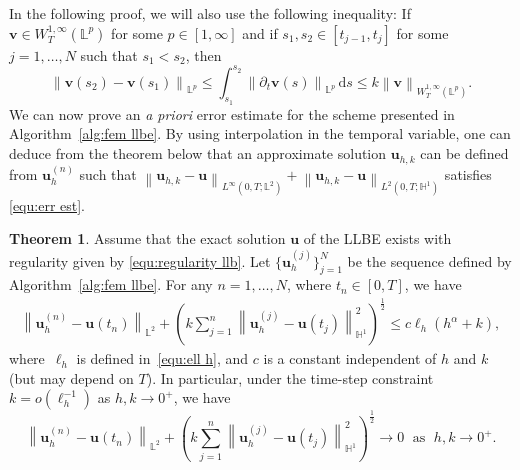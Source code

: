 \documentclass[11pt,reqno]{amsart}
\theoremstyle{definition}
\newtheorem{theorem}{Theorem}[section]
\numberwithin{equation}{section}
\newcommand{\bff}{\boldsymbol}
\newcommand{\bb}{\mathbb}
\newcommand{\ds}{\mathrm{d}s}
\newcommand{\norm}[2]{\left\|{#1}\right\|_{#2}}
\begin{document}
In the following proof, we will also use the following inequality: If $\bff{v}\in W^{1,\infty}_T(\bb{L}^p)$ for some $p\in [1,\infty]$ and if $s_1,s_2\in [t_{j-1},t_j]$ for some $j=1,\ldots,N$ such that $s_1<s_2$, then
\begin{equation}\label{equ:uj uj1}
	\norm{\bff{v}(s_2)-\bff{v}(s_1)}{\bb{L}^p}
	\leq
	\int_{s_1}^{s_2} \norm{\partial_t \bff{v} (s)}{\bb{L}^p}\, \ds
	\leq
	k \norm{\bff{v}}{W^{1,\infty}_T(\bb{L}^p)}.
\end{equation}
We can now prove an \emph{a priori} error estimate for the scheme presented in Algorithm~\ref{alg:fem llbe}. {By using interpolation in the temporal variable, one can deduce from the theorem below that an approximate solution $\bff{u}_{h,k}$ can be defined from $\bff{u}_h^{(n)}$ such that $\norm{\bff{u}_{h,k}-\bff{u}}{L^\infty(0,T;\bb{L}^2)}+\norm{\bff{u}_{h,k}-\bff{u}}{L^2(0,T;\bb{H}^1)}$ satisfies \eqref{equ:err est}.}

\begin{theorem}\label{the:err llb}
	Assume that the exact solution $\bff{u}$ of the LLBE exists with regularity given by \eqref{equ:regularity llb}. {Let $\big\{\bff{u}_h^{(j)}\big\}_{j=1}^N$ be the sequence defined by Algorithm~\ref{alg:fem llbe}.}
	For any $n=1,\ldots,N$, where $t_n\in [0,T]$, we have
	\begin{align}\label{equ:err est}
	\norm{\bff{u}_h^{(n)}-\bff{u}(t_n)}{\bb{L}^2}
	+
	\left(k \sum_{j=1}^n \norm{\bff{u}_h^{(j)}-\bff{u}(t_j)}{\bb{H}^1}^2 \right)^{\frac12}
	\leq c\ell_h (h^\alpha+k),
	\end{align}
	where~$\ell_h$ is defined in~\eqref{equ:ell h}, and $c$ is a constant independent of $h$ and $k$ (but may depend on $T$). In particular, under the time-step constraint $k=o(\ell_h^{-1})$ as $h,k\to 0^+$, we have 
	\begin{equation*}
	\norm{\bff{u}_h^{(n)}-\bff{u}(t_n)}{\bb{L}^2}+
	\left(k \sum_{j=1}^n \norm{\bff{u}_h^{(j)}-\bff{u}(t_j)}{\bb{H}^1}^2 \right)^{\frac12}\to 0 \;\text{ as }\; h,k\to 0^+.
	\end{equation*}
\end{theorem}
\end{document}
